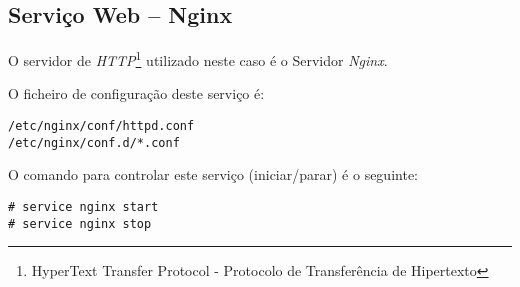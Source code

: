 \subsection{Serviço Web -- Nginx}

O servidor de \emph{HTTP}\footnote{HyperText Transfer Protocol - Protocolo de Transferência de Hipertexto} utilizado neste caso é o Servidor \emph{Nginx}.

O ficheiro de configuração deste serviço é:

\begin{Verbatim}[commandchars=\\\{\}]
/etc/nginx/conf/httpd.conf
/etc/nginx/conf.d/*.conf
\end{Verbatim}

O comando para controlar este serviço (iniciar/parar) é o seguinte:

\begin{Verbatim}[commandchars=\\\{\}]
# service nginx start
# service nginx stop
\end{Verbatim}

